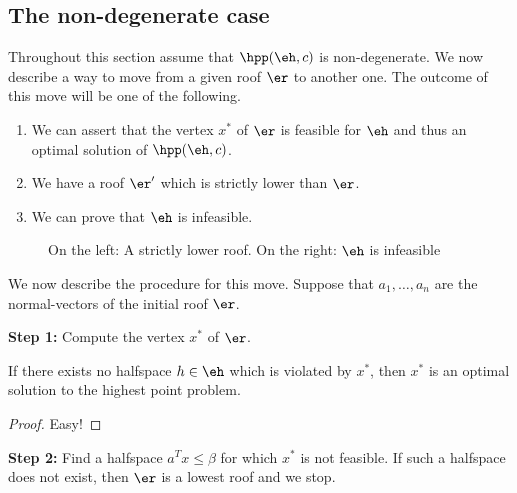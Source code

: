 \subsection{The non-degenerate case}
\label{sec:non-degenerate-case}

Throughout this section assume that  $\hpp(\eh,c)$ is non-degenerate. 
We now describe a way to move from a given roof $\er$ to another
one. The outcome of this move will be one of the following.
\begin{enumerate}
\item We can assert  that  the vertex $x^*$ of $\er$ is feasible for $\eh$ and
  thus an optimal  solution of $\hpp(\eh,c)$.  
\item We have a roof $\er'$ which is strictly lower than $\er$.
\item We can prove that $\eh$ is infeasible.
\end{enumerate}

\begin{figure}[htbp]
  \centering
  \caption{On the left: A strictly lower roof. On the right: $\eh$
    is infeasible}
  \label{fig:two-poss}
\end{figure}


We now describe the procedure for this move. Suppose that $a_1,\ldots,a_n$
are the normal-vectors of the initial roof $\er$.

\noindent 
{\bf Step 1:}  Compute the vertex $x^*$ of $\er$. 

\begin{lemma}
  \label{lem:5}
  If there exists no halfspace $h \in \eh$ which is violated by $x^*$,
  then $x^*$ is an optimal solution to the highest point problem. 
\end{lemma}

\begin{proof}
  Easy!
\end{proof}

\noindent
{\bf Step 2:} Find a halfspace $a^Tx\leq\beta$ for which $x^*$ is not
feasible. If such a halfspace does not exist, then $\er$ is a lowest
roof and we stop.   


